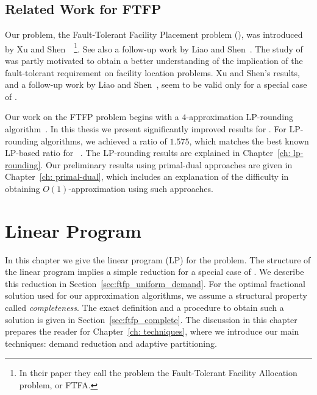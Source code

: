 \documentclass[oneside,final]{ucr}
\begin{document}
\section{Related Work for FTFP}
Our problem, the Fault-Tolerant Facility Placement problem
(\FTFP), was introduced by Xu and
Shen~\cite{XuS09}~\footnote{In their paper they call the
  problem the Fault-Tolerant Facility Allocation problem, or
  FTFA.}. See also a follow-up work by Liao and
Shen~\cite{LiaoS11}. The study of {\FTFP} was partly
motivated to obtain a better understanding of the
implication of the fault-tolerant requirement on facility
location problems.  Xu and Shen's results, and a follow-up
work by Liao and Shen~\cite{LiaoS11}, seem to be valid only
for a special case of {\FTFP}.

Our work on the FTFP problem begins with a $4$-approximation
LP-rounding algorithm~\cite{YanC11}. In this thesis we
present significantly improved results for {\FTFP}. For
LP-rounding algorithms, we achieved a ratio of $1.575$,
which matches the best known LP-based ratio for
{\UFL}~\cite{ByrkaGS10}. The LP-rounding results are
explained in Chapter~\ref{ch: lp-rounding}. Our preliminary
results using primal-dual approaches are given in
Chapter~\ref{ch: primal-dual}, which includes an explanation
of the difficulty in obtaining $O(1)$-approximation using
such approaches.


\chapter{Linear Program} \label{ch: lp} 

In this chapter we give the linear program (LP) for the
{\FTFP} problem. The structure of the linear program implies
a simple reduction for a special case of {\FTFP}. We
describe this reduction in
Section~\ref{sec:ftfp_uniform_demand}. For the optimal
fractional solution used for our approximation algorithms,
we assume a structural property called
\emph{completeness}. The exact definition and a procedure to
obtain such a solution is given in
Section~\ref{sec:ftfp_complete}. The discussion in this
chapter prepares the reader for Chapter~\ref{ch:
  techniques}, where we introduce our main techniques:
demand reduction and adaptive partitioning.
\end{document}
